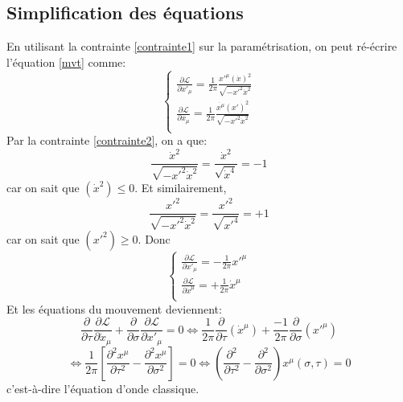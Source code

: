 \documentclass[a4paper,12pt]{article}
\def\xmu{x^\mu}
\def\CL{\mathcal{L}}
\begin{document}
\subsection{Simplification des équations}
En utilisant la contrainte \eqref{contrainte1} sur la paramétrisation, on peut ré-écrire l'équation \eqref{mvt} comme:
\begin{equation*}
	\left\lbrace
	\begin{aligned}
	\frac{\partial \CL}{\partial x'_\mu }=\frac{1}{2\pi}\frac{x'^\mu (\dot{x})^2}{\sqrt{-x'^2\dot{x}^2}}\\
	\frac{\partial \CL}{\partial \dot{x_\mu}}=\frac{1}{2\pi}\frac{\dot{\xmu} (x')^2}{\sqrt{-x'^2\dot{x}^2}}\\
	\end{aligned}
	\right.
\end{equation*}
Par la contrainte \eqref{contrainte2}, on a que:
$$\frac{\dot{x}^2}{\sqrt{-x'^2\dot{x}^2}}=\frac{\dot{x}^2}{\sqrt{\dot{x}^4}}=-1$$ car on sait que $(\dot{x}^2)\leq0$.
Et similairement,
$$\frac{x'^2}{\sqrt{-x'^2\dot{x}^2}}=\frac{x'^2}{\sqrt{x'^4}}=+1$$
car on sait que $(x'^2)\geq0$.
Donc
\begin{equation*}
	\left\lbrace
	\begin{aligned}
	\frac{\partial \CL}{\partial x'_\mu }=-\frac{1}{2\pi}x'^\mu\\
	\frac{\partial \CL}{\partial \dot{x}^\mu}=+\frac{1}{2\pi}\dot{x}^\mu\\
	\end{aligned}
	\right.
\end{equation*}
Et les équations du mouvement deviennent:
$$\frac{\partial}{\partial \tau}\frac{\partial \CL}{\partial \dot{x}_{\mu}}+\frac{\partial}{\partial \sigma}\frac{\partial \CL}{\partial  x'_{\mu}}=0 \Leftrightarrow \frac{1}{2\pi}\frac{\partial}{\partial \tau}\left( \dot{x}^\mu\right)+\frac{-1}{2\pi}\frac{\partial}{\partial \sigma}\left( x'^\mu\right) $$
$$\Leftrightarrow \frac{1}{2\pi}\left[ \frac{\partial^2 x^\mu}{\partial \tau^2}-\frac{\partial^2 x^\mu}{\partial \sigma^2}\right] =0 \Leftrightarrow \left( \frac{\partial^2}{\partial \tau^2}-\frac{\partial^2 }{\partial \sigma^2}\right) \xmu(\sigma,\tau)=0$$
c'est-à-dire l'équation d'onde classique.
\end{document}
